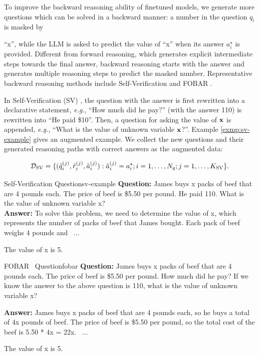 To improve the backward reasoning ability of finetuned models, we generate more questions which can be solved in a backward manner: a number in the question $q_i$ is masked by 

``x'', while the LLM is asked to predict the value of ``x'' when its answer $a_i^\star$
is provided. Different from forward reasoning, which generates explicit intermediate steps towards the final answer, backward reasoning starts with the answer and generates multiple reasoning steps to predict the masked number. Representative backward reasoning methods include Self-Verification \citep{weng2023large} and FOBAR \citep{jiang2023backward}.

In Self-Verification (SV) \citep{weng2023large}, the question with the answer is first rewritten into a declarative statement, \emph{e.g.}, ``How much did he pay?'' (with the answer 110) is rewritten into ``He paid \$10''. 
Then, a question for asking the value of ${\bf x}$ is appended, \emph{e.g.}, ``What is the value of unknown variable ${\bf x}$?''. Example \ref{exmp:sv-example} gives an augmented example. We collect the new questions and their generated reasoning paths with correct answers as the augmented data:

\begin{equation}
\small
\mathcal{D}_{\text{SV}} = \{(\tilde{q}_i^{(j)}, \tilde{r}_i^{(j)}, \tilde{a}_i^{(j)}): \tilde{a}_i^{(j)} = a_i^\star;  i=1,\dots, N_q; j=1,\dots, K_{\text{SV}}\}.
\end{equation}

\begin{exmp}{Self-Verification \citep{weng2023large} Question}{sv-example}
\small
\textbf{Question:} James buys {\color{red3}x} packs of beef that are 4 pounds each.  The price of beef is \$5.50 per pound. He paid 110.
{\color{red3}What is the value of unknown variable x?} \\
\textbf{Answer:} 
To solve this problem, we need to determine the value of x, which represents the number of packs of beef that James bought. Each pack of beef weighs 4 pounds and ~...~

The value of x is 5.
\end{exmp}

\begin{exmp}{FOBAR~\citep{jiang2023backward} Question}{fobar}\small
\textbf{Question:} 
James buys {\color{red3}x} packs of beef that are 4 pounds each.  The price of beef is \$5.50 per pound.  How much did he pay?
{\color{red3}\!If we know the answer to the above question is 110, what is the value of unknown variable x?\!\!\!}

\textbf{Answer:}
James buys x packs of beef that are 4 pounds each, so he buys a total of 4x pounds of beef. The price of beef is \$5.50 per pound, so the total cost of the beef is 5.50 * 4x = 22x. ~...~

The value of x is 5.
\end{exmp}

